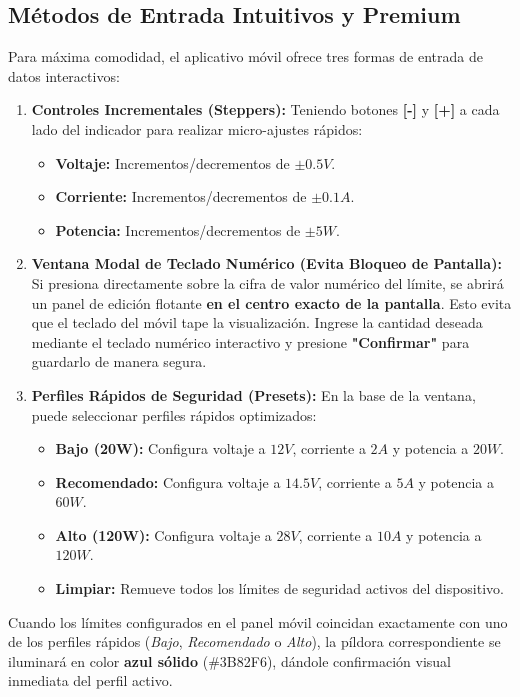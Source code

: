 \documentclass[11pt,a4paper]{article}
\begin{document}
\subsection{Métodos de Entrada Intuitivos y Premium}
Para máxima comodidad, el aplicativo móvil ofrece tres formas de entrada de datos interactivos:
\begin{enumerate}
    \item \textbf{Controles Incrementales (Steppers):} Teniendo botones \textbf{[-]} y \textbf{[+]} a cada lado del indicador para realizar micro-ajustes rápidos:
    \begin{itemize}
        \item \textbf{Voltaje:} Incrementos/decrementos de $\pm 0.5V$.
        \item \textbf{Corriente:} Incrementos/decrementos de $\pm 0.1A$.
        \item \textbf{Potencia:} Incrementos/decrementos de $\pm 5W$.
    \end{itemize}
    \item \textbf{Ventana Modal de Teclado Numérico (Evita Bloqueo de Pantalla):} Si presiona directamente sobre la cifra de valor numérico del límite, se abrirá un panel de edición flotante \textbf{en el centro exacto de la pantalla}. Esto evita que el teclado del móvil tape la visualización. Ingrese la cantidad deseada mediante el teclado numérico interactivo y presione \textbf{"Confirmar"} para guardarlo de manera segura.
    \item \textbf{Perfiles Rápidos de Seguridad (Presets):} En la base de la ventana, puede seleccionar perfiles rápidos optimizados:
    \begin{itemize}
        \item \textbf{Bajo (20W):} Configura voltaje a $12V$, corriente a $2A$ y potencia a $20W$.
        \item \textbf{Recomendado:} Configura voltaje a $14.5V$, corriente a $5A$ y potencia a $60W$.
        \item \textbf{Alto (120W):} Configura voltaje a $28V$, corriente a $10A$ y potencia a $120W$.
        \item \textbf{Limpiar:} Remueve todos los límites de seguridad activos del dispositivo.
    \end{itemize}
\end{enumerate}

\begin{infoBox}
Cuando los límites configurados en el panel móvil coincidan exactamente con uno de los perfiles rápidos (\textit{Bajo}, \textit{Recomendado} o \textit{Alto}), la píldora correspondiente se iluminará en color \textbf{azul sólido} (\#3B82F6), dándole confirmación visual inmediata del perfil activo.
\end{infoBox}
\end{document}
